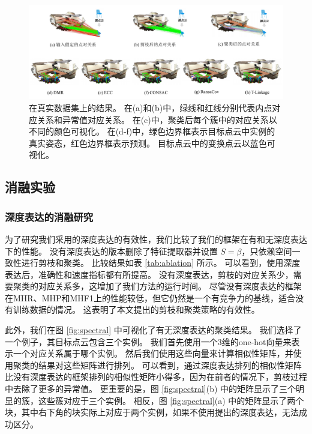\begin{figure}
        \centering
        \includegraphics[width=1.0\textwidth]{images/DMR_real.pdf}
        \caption{
          在真实数据集上的结果。
          在(a)和(b)中，绿线和红线分别代表内点对应关系和异常值对应关系。
          在(c)中，聚类后每个簇中的对应关系以不同的颜色可视化。
          在(d-f)中，绿色边界框表示目标点云中实例的真实姿态，红色边界框表示预测。
          目标点云中的变换点云以蓝色可视化。
        }
        \label{fig:DMR_real}
\end{figure}
      
\subsection{消融实验}
\label{sec:ablation}
\subsubsection{深度表达的消融研究}为了研究我们采用的深度表达的有效性，我们比较了我们的框架在有和无深度表达下的性能。
没有深度表达的版本删除了特征提取器并设置 $S=\beta$，只依赖空间一致性进行剪枝和聚类。
比较结果如表 \ref{tab:ablation} 所示。
可以看到，使用深度表达后，准确性和速度指标都有所提高。
没有深度表达，剪枝的对应关系少，需要聚类的对应关系多，这增加了我们方法的运行时间。
尽管没有深度表达的框架在MHR、MHP和MHF1上的性能较低，但它仍然是一个有竞争力的基线，适合没有训练数据的情况。
这表明了本文提出的剪枝和聚类策略的有效性。

此外，我们在图 \ref{fig:spectral} 中可视化了有无深度表达的聚类结果。
我们选择了一个例子，其目标点云包含三个实例。
我们首先使用一个3维的one-hot向量来表示一个对应关系属于哪个实例。
然后我们使用这些向量来计算相似性矩阵，并使用聚类的结果对这些矩阵进行排列。
可以看到，通过深度表达排列的相似性矩阵比没有深度表达的框架排列的相似性矩阵小得多，因为在前者的情况下，剪枝过程中去除了更多的异常值。
更重要的是，图 \ref{fig:spectral}(b) 中的矩阵显示了三个明显的簇，这些簇对应于三个实例。
相反，图 \ref{fig:spectral}(a) 中的矩阵显示了两个块，其中右下角的块实际上对应于两个实例，如果不使用提出的深度表达，无法成功区分。

